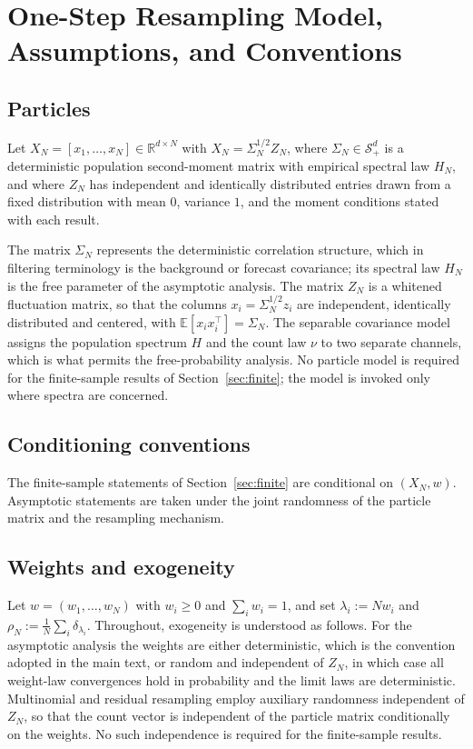 \documentclass[lettersize,journal]{IEEEtran}
\theoremstyle{remark}
\begin{document}
\section{One-Step Resampling Model, Assumptions, and Conventions}
\label{sec:model}

\subsection{Particles}

Let $X_N=[x_1,\dots,x_N]\in\mathbb{R}^{d\times N}$ with
$X_N=\Sigma_N^{1/2}Z_N$, where $\Sigma_N\in\mathcal{S}_+^d$ is a
deterministic population second-moment matrix with empirical spectral law
$H_N$, and where $Z_N$ has independent and identically distributed entries
drawn from a fixed distribution with mean $0$, variance $1$, and the moment
conditions stated with each result.

The matrix $\Sigma_N$ represents the deterministic correlation structure,
which in filtering terminology is the background or forecast covariance; its
spectral law $H_N$ is the free parameter of the asymptotic analysis. The
matrix $Z_N$ is a whitened fluctuation matrix, so that the columns
$x_i=\Sigma_N^{1/2}z_i$ are independent, identically distributed and centered,
with $\mathbb{E}[x_ix_i^\top]=\Sigma_N$. The separable covariance model
assigns the population spectrum $H$ and the count law $\nu$ to two separate
channels, which is what permits the free-probability analysis. No particle
model is required for the finite-sample results of
Section~\ref{sec:finite}; the model is invoked only where spectra are
concerned.

\subsection{Conditioning conventions}

The finite-sample statements of Section~\ref{sec:finite} are conditional on
$(X_N,w)$. Asymptotic statements are taken under the joint randomness of the
particle matrix and the resampling mechanism.

\subsection{Weights and exogeneity}

Let $w=(w_1,\dots,w_N)$ with $w_i\ge0$ and $\sum_iw_i=1$, and set
$\lambda_i:=Nw_i$ and $\rho_N:=\frac1N\sum_i\delta_{\lambda_i}$. Throughout,
exogeneity is understood as follows. For the asymptotic analysis the weights
are either deterministic, which is the convention adopted in the main text, or
random and independent of $Z_N$, in which case all weight-law convergences
hold in probability and the limit laws are deterministic. Multinomial and
residual resampling employ auxiliary randomness independent of $Z_N$, so that
the count vector is independent of the particle matrix conditionally on the
weights. No such independence is required for the finite-sample results.
\end{document}
